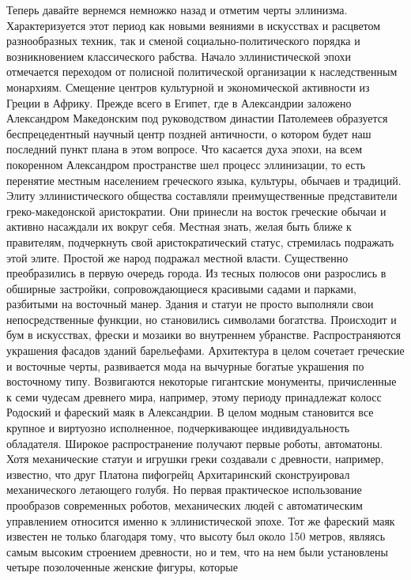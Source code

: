 Теперь давайте вернемся немножко назад и отметим черты эллинизма.
Характеризуется этот период как новыми веяниями в искусствах и расцветом
разнообразных техник, так и сменой социально-политического порядка и
возникновением классического рабства. Начало эллинистической эпохи отмечается
переходом от полисной политической организации к наследственным монархиям.
Смещение центров культурной и экономической активности из Греции в Африку.
Прежде всего в Египет, где в Александрии заложено Александром Македонским под
руководством династии Патолемеев образуется беспрецедентный научный центр
поздней античности, о котором будет наш последний пункт плана в этом вопросе.
Что касается духа эпохи, на всем покоренном Александром пространстве шел процесс
эллинизации, то есть перенятие местным населением греческого языка, культуры,
обычаев и традиций. Элиту эллинистического общества составляли преимущественные
представители греко-македонской аристократии. Они принесли на восток греческие
обычаи и активно насаждали их вокруг себя. Местная знать, желая быть ближе к
правителям, подчеркнуть свой аристократический статус, стремилась подражать этой
элите. Простой же народ подражал местной власти. Существенно преобразились в
первую очередь города. Из тесных полюсов они разрослись в обширные застройки,
сопровождающиеся красивыми садами и парками, разбитыми на восточный манер.
Здания и статуи не просто выполняли свои непосредственные функции, но
становились символами богатства. Происходит и бум в искусствах, фрески и мозаики
во внутреннем убранстве. Распространяются украшения фасадов зданий барельефами.
Архитектура в целом сочетает греческие и восточные черты, развивается мода на
вычурные богатые украшения по восточному типу. Возвигаются некоторые гигантские
монументы, причисленные к семи чудесам древнего мира, например, этому периоду
принадлежат колосс Родоский и фареский маяк в Александрии. В целом модным
становится все крупное и виртуозно исполненное, подчеркивающее индивидуальность
обладателя. Широкое распространение получают первые роботы, автоматоны. Хотя
механические статуи и игрушки греки создавали с древности, например, известно,
что друг Платона пифогрейц Архитаринский сконструировал механического летающего
голубя. Но первая практическое использование прообразов современных роботов,
механических людей с автоматическим управлением относится именно к
эллинистической эпохе. Тот же фареский маяк известен не только благодаря тому,
что высоту был около 150 метров, являясь самым высоким строением древности, но и
тем, что на нем были установлены четыре позолоченные женские фигуры, которые
